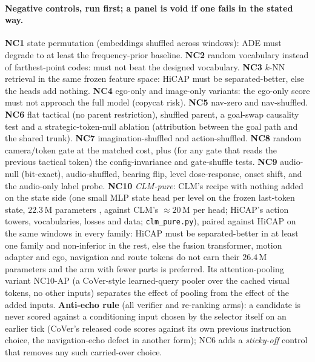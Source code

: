 \paragraph{Negative controls, run first; a panel is void if one fails in the stated way.}
\textbf{NC1} state permutation (embeddings shuffled across windows): ADE must degrade to at least the frequency-prior baseline. \textbf{NC2} random vocabulary instead of farthest-point codes: must not beat the designed vocabulary. \textbf{NC3} $k$-NN retrieval in the same frozen feature space: HiCAP must be separated-better, else the heads add nothing. \textbf{NC4} ego-only and image-only variants: the ego-only score must not approach the full model (copycat risk). \textbf{NC5} nav-zero and nav-shuffled. \textbf{NC6} flat tactical (no parent restriction), shuffled parent, a goal-swap causality test and a strategic-token-null ablation (attribution between the goal path and the shared trunk). \textbf{NC7} imagination-shuffled and action-shuffled. \textbf{NC8} random camera/token gate at the matched cost, plus (for any gate that reads the previous tactical token) the config-invariance and gate-shuffle tests. \textbf{NC9} audio-null (bit-exact), audio-shuffled, bearing flip, level dose-response, onset shift, and the audio-only label probe. \textbf{NC10} \emph{CLM-pure}: CLM's recipe with nothing added on the state side (one small MLP state head per level on the frozen last-token state, $22.3$\,M parameters \evM, against CLM's $\approx20$\,M per head; HiCAP's action towers, vocabularies, losses and data; \texttt{clm\_pure.py}), paired against HiCAP on the same windows in every family: HiCAP must be separated-better in at least one family and non-inferior in the rest, else the fusion transformer, motion adapter and ego, navigation and route tokens do not earn their $26.4$\,M parameters and the arm with fewer parts is preferred. Its attention-pooling variant NC10-AP (a CoVer-style learned-query pooler over the cached visual tokens, no other inputs) separates the effect of pooling from the effect of the added inputs. \textbf{Anti-echo rule} (all verifier and re-ranking arms): a candidate is never scored against a conditioning input chosen by the selector itself on an earlier tick (CoVer's released code scores against its own previous instruction choice, the navigation-echo defect in another form); NC6 adds a \emph{sticky-off} control that removes any such carried-over choice.

